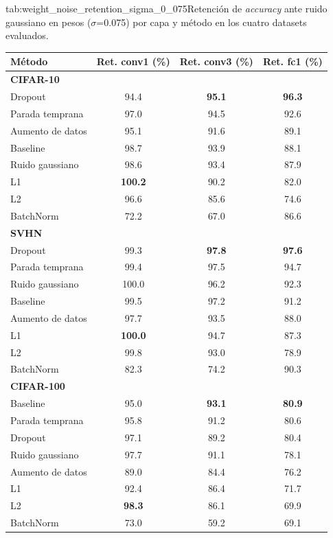 \begin{table}{tab:weight_noise_retention_sigma_0_075}{Retención de \textit{accuracy} ante ruido gaussiano en pesos ($\sigma$=0.075) por capa y método en los cuatro datasets evaluados.}
\small
\begin{tabular}{lccc}
\toprule
\textbf{Método} & \textbf{Ret. conv1 (\%)} & \textbf{Ret. conv3 (\%)} & \textbf{Ret. fc1 (\%)} \\
\midrule
\multicolumn{4}{l}{\textbf{CIFAR-10}}\\
\midrule
Dropout & 94.4 & \textbf{95.1} & \textbf{96.3} \\
Parada temprana & 97.0 & 94.5 & 92.6 \\
Aumento de datos & 95.1 & 91.6 & 89.1 \\
Baseline & 98.7 & 93.9 & 88.1 \\
Ruido gaussiano & 98.6 & 93.4 & 87.9 \\
L1 & \textbf{100.2} & 90.2 & 82.0 \\
L2 & 96.6 & 85.6 & 74.6 \\
BatchNorm & 72.2 & 67.0 & 86.6 \\
\midrule
\multicolumn{4}{l}{\textbf{SVHN}}\\
\midrule
Dropout & 99.3 & \textbf{97.8} & \textbf{97.6} \\
Parada temprana & 99.4 & 97.5 & 94.7 \\
Ruido gaussiano & 100.0 & 96.2 & 92.3 \\
Baseline & 99.5 & 97.2 & 91.2 \\
Aumento de datos & 97.7 & 93.5 & 88.0 \\
L1 & \textbf{100.0} & 94.7 & 87.3 \\
L2 & 99.8 & 93.0 & 78.9 \\
BatchNorm & 82.3 & 74.2 & 90.3 \\
\midrule
\multicolumn{4}{l}{\textbf{CIFAR-100}}\\
\midrule
Baseline & 95.0 & \textbf{93.1} & \textbf{80.9} \\
Parada temprana & 95.8 & 91.2 & 80.6 \\
Dropout & 97.1 & 89.2 & 80.4 \\
Ruido gaussiano & 97.7 & 91.1 & 78.1 \\
Aumento de datos & 89.0 & 84.4 & 76.2 \\
L1 & 92.4 & 86.4 & 71.7 \\
L2 & \textbf{98.3} & 86.1 & 69.9 \\
BatchNorm & 73.0 & 59.2 & 69.1 \\
\midrule

\end{tabular}
\end{table}
